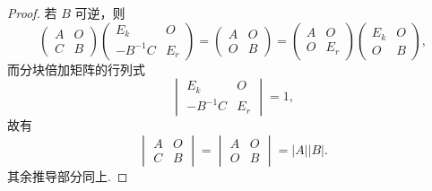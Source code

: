 \begin{enumerate}
\begin{proof}
              若 $B$ 可逆，则
              \[
                  \begin{pmatrix}
                      A & O \\ C & B
                  \end{pmatrix} \begin{pmatrix}
                      E_k & O \\ -B^{-1} C & E_r
                  \end{pmatrix} = \begin{pmatrix}
                      A & O \\ O & B
                  \end{pmatrix} = \begin{pmatrix}
                      A & O \\ O & E_r
                  \end{pmatrix} \begin{pmatrix}
                      E_k & O \\ O & B
                  \end{pmatrix},
              \]
              而分块倍加矩阵的行列式
              \[
                  \begin{vmatrix}
                      E_k & O \\ -B^{-1} C & E_r
                  \end{vmatrix} = 1,
              \]
              故有
              \[
                  \begin{vmatrix}
                      A & O \\ C & B
                  \end{vmatrix} = \begin{vmatrix}
                      A & O \\ O & B
                  \end{vmatrix} = |A||B|.
              \]
              其余推导部分同上.
          \end{proof}


\end{enumerate}
